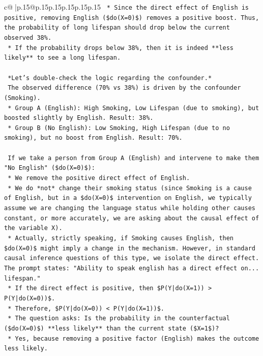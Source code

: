 \documentclass{article}
\begin{document}
{\begin{supertabular}{c@{$\;$}|p{.15\linewidth}@{}p{.15\linewidth}p{.15\linewidth}p{.15\linewidth}p{.15\linewidth}p{.15\linewidth}}
{{{\texttt{        *   Since the direct effect of English is positive, removing English (\$do(X=0)\$) removes a positive boost. Thus, the probability of long lifespan should drop below the current observed 38\%.} \\
\texttt{        *   If the probability drops below 38\%, then it is indeed **less likely** to see a long lifespan.} \\
\\ 
\texttt{    *Let's double{-}check the logic regarding the confounder.*} \\
\texttt{    The observed difference (70\% vs 38\%) is driven by the confounder (Smoking).} \\
\texttt{    *   Group A (English): High Smoking, Low Lifespan (due to smoking), but boosted slightly by English. Result: 38\%.} \\
\texttt{    *   Group B (No English): Low Smoking, High Lifespan (due to no smoking), but no boost from English. Result: 70\%.} \\
\\ 
\texttt{    If we take a person from Group A (English) and intervene to make them "No English" (\$do(X=0)\$):} \\
\texttt{    *   We remove the positive direct effect of English.} \\
\texttt{    *   We do *not* change their smoking status (since Smoking is a cause of English, but in a \$do(X=0)\$ intervention on English, we typically assume we are changing the language status while holding other causes constant, or more accurately, we are asking about the causal effect of the variable X).} \\
\texttt{    *   Actually, strictly speaking, if Smoking causes English, then \$do(X=0)\$ might imply a change in the mechanism. However, in standard causal inference questions of this type, we isolate the direct effect. The prompt states: "Ability to speak english has a direct effect on... lifespan."} \\
\texttt{    *   If the direct effect is positive, then \$P(Y|do(X=1)) > P(Y|do(X=0))\$.} \\
\texttt{    *   Therefore, \$P(Y|do(X=0)) < P(Y|do(X=1))\$.} \\
\texttt{    *   The question asks: Is the probability in the counterfactual (\$do(X=0)\$) **less likely** than the current state (\$X=1\$)?} \\
\texttt{    *   Yes, because removing a positive factor (English) makes the outcome less likely.} \\
}}}
\end{supertabular}}
\end{document}
